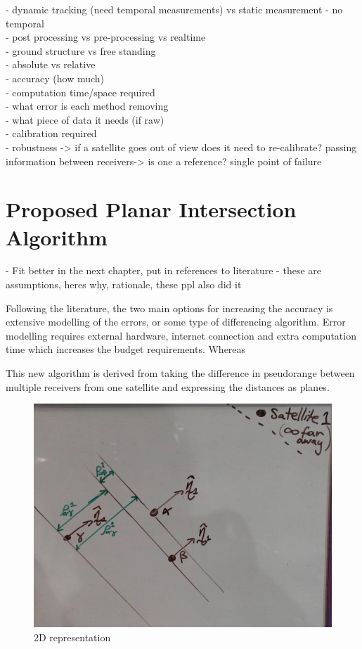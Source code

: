 - dynamic tracking (need temporal measurements) vs static measurement - no temporal\\
- post processing vs pre-processing vs realtime\\
- ground structure vs free standing\\
- absolute vs relative\\
- accuracy (how much)\\
- computation time/space required\\
- what error is each method removing\\
- what piece of data it needs (if raw)\\
- calibration required\\
- robustness -> if a satellite goes out of view does it need to re-calibrate? passing information between receivers-> is one a reference? single point of failure



\section{Proposed Planar Intersection Algorithm}
- Fit better in the next chapter, put in references to literature
- these are assumptions, heres why, rationale, these ppl also did it

Following the literature, the two main options for increasing the accuracy is extensive modelling of the errors, or some type of differencing algorithm. Error modelling requires external hardware, internet connection and extra computation time which increases the budget requirements. Whereas 



This new algorithm is derived from taking the difference in pseudorange between multiple receivers from one satellite and expressing the distances as planes.
\begin{figure}[h]
\centering
\caption{2D representation}
\label{fig:overall_singleS_multiR}
\includegraphics[width=0.7\linewidth]{ChapterLiteratureReview/overall_singleS_multiR.jpg}
\end{figure}

